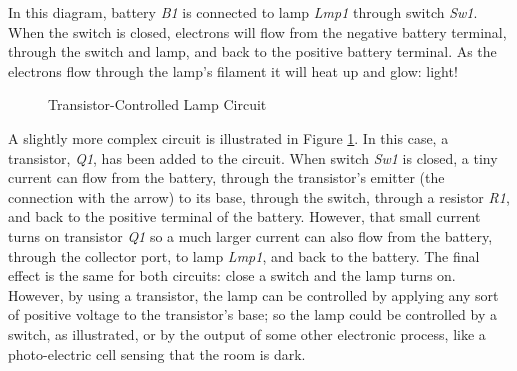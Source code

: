 In this diagram, battery \emph{B1} is connected to lamp \emph{Lmp1} through switch \emph{Sw1}. When the switch is closed, electrons will flow from the negative battery terminal, through the switch and lamp, and back to the positive battery terminal. As the electrons flow through the lamp's filament it will heat up and glow: light! 

\begin{figure}[htb]
  \myfloatalign
  \caption{Transistor-Controlled Lamp Circuit}
  \label{IN:fig:xistor_lamp_circuit}
\end{figure}

A slightly more complex circuit is illustrated in Figure \ref{IN:fig:xistor_lamp_circuit}. In this case, a transistor, \emph{Q1}, has been added to the circuit. When switch \emph{Sw1} is closed, a tiny current can flow from the battery, through the transistor's emitter (the connection with the arrow) to its base, through the switch, through a resistor \emph{R1}, and back to the positive terminal of the battery. However, that small current turns on transistor \emph{Q1} so a much larger current can also flow from the battery, through the collector port, to lamp \emph{Lmp1}, and back to the battery. The final effect is the same for both circuits: close a switch and the lamp turns on. However, by using a transistor, the lamp can be controlled by applying any sort of positive voltage to the transistor's base; so the lamp could be controlled by a switch, as illustrated, or by the output of some other electronic process, like a photo-electric cell sensing that the room is dark.


